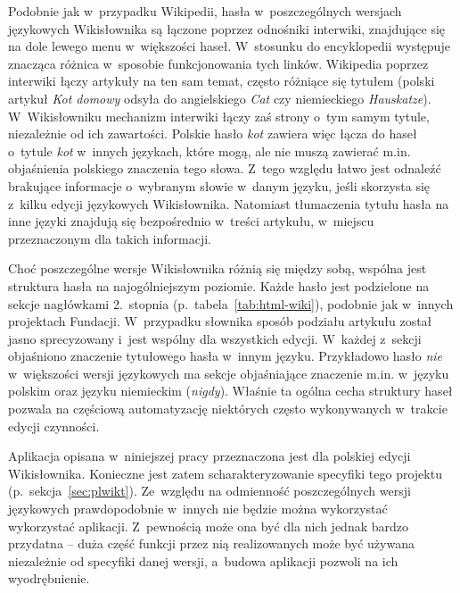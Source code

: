 Podobnie jak w~przypadku Wikipedii, hasła w~poszczególnych wersjach językowych Wikisłownika są łączone poprzez odnośniki interwiki, znajdujące się na dole lewego menu w~większości haseł. W~stosunku do encyklopedii występuje znacząca różnica w~sposobie funkcjonowania tych linków. Wikipedia poprzez interwiki łączy artykuły na ten sam temat, często różniące się tytułem (polski artykuł \emph{Kot domowy} odsyła do angielskiego \emph{Cat} czy niemieckiego \emph{Hauskatze}). W~Wikisłowniku mechanizm interwiki łączy zaś strony o~tym samym tytule, niezależnie od ich zawartości. Polskie hasło \emph{kot} zawiera więc łącza do haseł o~tytule \emph{kot} w~innych językach, które mogą, ale nie muszą zawierać m.in. objaśnienia polskiego znaczenia tego słowa. Z~tego względu łatwo jest odnaleźć brakujące informacje o~wybranym słowie w~danym języku, jeśli skorzysta się z~kilku edycji językowych Wikisłownika. Natomiast tłumaczenia tytułu hasła na inne języki znajdują się bezpośrednio w~treści artykułu, w~miejscu przeznaczonym dla takich informacji.

Choć poszczególne wersje Wikisłownika różnią się między sobą, wspólna jest struktura hasła na najogólniejszym poziomie. Każde hasło jest podzielone na sekcje nagłówkami 2.~stopnia (p.~tabela~\ref{tab:html-wiki}), podobnie jak w~innych projektach Fundacji. W~przypadku słownika sposób podziału artykułu został jasno sprecyzowany i~jest wspólny dla wszystkich edycji. W~każdej z~sekcji objaśniono znaczenie tytułowego hasła w~innym języku. Przykładowo hasło \emph{nie} w~większości wersji językowych ma sekcje objaśniające znaczenie m.in. w~języku polskim oraz języku niemieckim (\emph{nigdy}). Właśnie ta ogólna cecha struktury haseł pozwala na częściową automatyzację niektórych często wykonywanych w~trakcie edycji czynności.

Aplikacja opisana w~niniejszej pracy przeznaczona jest dla polskiej edycji Wikisłownika. Konieczne jest zatem scharakteryzowanie specyfiki tego projektu (p.~sekcja~\ref{sec:plwikt}). Ze~względu na odmienność poszczególnych wersji językowych prawdopodobnie w~innych nie będzie można wykorzystać wykorzystać aplikacji. Z~pewnością może ona być dla nich jednak bardzo przydatna -- duża część funkcji przez nią realizowanych może być używana niezależnie od specyfiki danej wersji, a~budowa aplikacji pozwoli na ich wyodrębnienie.

